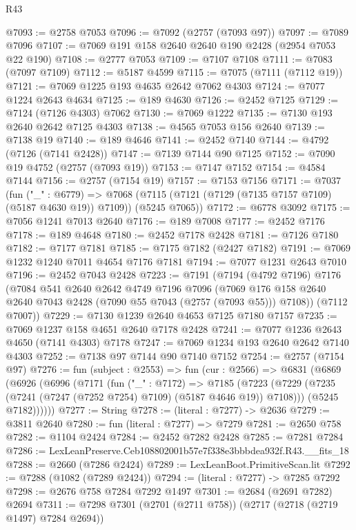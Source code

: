 \begin{lexlean}{R43}
\begin{coremodule}
@7093 := @2758 @7053
@7096 := @7092 (@2757 (@7093 @97))
@7097 := @7089 @7096
@7107 := @7069 @191 @158 @2640 @2640 @190 @2428 (@2954 @7053 @22 @190)
@7108 := @2777 @7053
@7109 := @7107 @7108
@7111 := @7083 (@7097 @7109)
@7112 := @5187 @4599
@7115 := @7075 (@7111 (@7112 @19))
@7121 := @7069 @1225 @193 @4635 @2642 @7062 @4303
@7124 := @7077 @1224 @2643 @4634
@7125 := @189 @4630
@7126 := @2452 @7125
@7129 := @7124 (@7126 @4303) @7062
@7130 := @7069 @1222
@7135 := @7130 @193 @2640 @2642 @7125 @4303
@7138 := @4565 @7053 @156 @2640
@7139 := @7138 @19
@7140 := @189 @4646
@7141 := @2452 @7140
@7144 := @4792 (@7126 (@7141 @2428))
@7147 := @7139 @7144 @90 @7125
@7152 := @7090 @19 @4752 (@2757 (@7093 @19))
@7153 := @7147 @7152
@7154 := @4584 @7144
@7156 := @2757 (@7154 @19)
@7157 := @7153 @7156
@7171 := @7037
    (fun ("_" : @6779) =>
    @7068 (@7115 (@7121 (@7129 (@7135 @7157 @7109) (@5187 @4630 @19)) @7109)) (@5245 @7065))
@7172 := @6778 @3092
@7175 := @7056 @1241 @7013 @2640
@7176 := @189 @7008
@7177 := @2452 @7176
@7178 := @189 @4648
@7180 := @2452 @7178 @2428
@7181 := @7126 @7180
@7182 := @7177 @7181
@7185 := @7175 @7182 (@2427 @7182)
@7191 := @7069 @1232 @1240 @7011 @4654 @7176 @7181
@7194 := @7077 @1231 @2643 @7010
@7196 := @2452 @7043 @2428
@7223 := @7191
    (@7194
      (@4792 @7196)
      @7176
      (@7084
        @541
        @2640
        @2642
        @4749
        @7196
        @7096
        (@7069 @176 @158 @2640 @2640 @7043 @2428 (@7090 @55 @7043 (@2757 (@7093 @55))) @7108))
      (@7112 @7007))
@7229 := @7130 @1239 @2640 @4653 @7125 @7180 @7157
@7235 := @7069 @1237 @158 @4651 @2640 @7178 @2428
@7241 := @7077 @1236 @2643 @4650 (@7141 @4303) @7178
@7247 := @7069 @1234 @193 @2640 @2642 @7140 @4303
@7252 := @7138 @97 @7144 @90 @7140 @7152
@7254 := @2757 (@7154 @97)
@7276 := fun (subject : @2553) =>
  fun (cur : @2566) =>
  @6831
    (@6869
      (@6926
        (@6996
          (@7171
            (fun ("_" : @7172) =>
            @7185
              (@7223 (@7229 (@7235 (@7241 (@7247 (@7252 @7254) @7109) (@5187 @4646 @19)) @7108)))
              (@5245 @7182))))))
@7277 := String
@7278 := (literal : @7277) -> @2636
@7279 := @3811 @2640
@7280 := fun (literal : @7277) => @7279
@7281 := @2650 @758
@7282 := @1104 @2424
@7284 := @2452 @7282 @2428
@7285 := @7281 @7284
@7286 := LexLeanPreserve.Ceb108802001b57e7f338e3bbbdea932f.R43.__fits_18
@7288 := @2660 (@7286 @2424)
@7289 := LexLeanBoot.PrimitiveScan.lit
@7292 := @7288 (@1082 (@7289 @2424))
@7294 := (literal : @7277) -> @7285 @7292
@7298 := @2676 @758 @7284 @7292 @1497
@7301 := @2684 (@2691 @7282) @2694
@7311 := @7298 @7301 (@2701 (@2711 @758)) (@2717 (@2718 (@2719 @1497) @7284 @2694))

\end{coremodule}
\end{lexlean}
